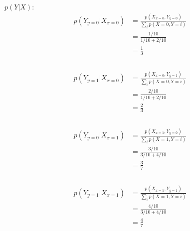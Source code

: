 \documentclass[12pt, fullpage,letterpaper]{article}
\begin{document}
\begin{enumerate}
\begin{enumerate}
\begin{enumerate}
             $p(Y|X)$:
            \[
            	\begin{split}
            		p(Y_{y=0}|X_{x=0}) &= \frac{p(X_{x=0},Y_{y=0})}{\sum_i p(X=0, Y=i)} 
            			\\
            			&= \frac{1/10}{1/10 + 2/10}
            			\\
            			&= \boxed{\frac{1}{3}}
            			\\
            	\end{split}
            \]
            \\
            \[
            	\begin{split}
            		p(Y_{y=1}|X_{x=0}) &= \frac{p(X_{x=0},Y_{y=1})}{\sum_i p(X=0, Y=i)} 
            			\\
            			&= \frac{2/10}{1/10 + 2/10}
            			\\
            			&= \boxed{\frac{2}{3}}
            			\\
            	\end{split}
            \]
            \\
            \[
            	\begin{split}
            		p(Y_{y=0}|X_{x=1}) &= \frac{p(X_{x=1},Y_{y=0})}{\sum_i p(X=1, Y=i)} 
            			\\
            			&= \frac{3/10}{3/10 + 4/10}
            			\\
            			&= \boxed{\frac{3}{7}}
            			\\
            	\end{split}
            \]
            \\
            \[
            	\begin{split}
            		p(Y_{y=1}|X_{x=1}) &= \frac{p(X_{x=1},Y_{y=1})}{\sum_i p(X=1, Y=i)} 
            			\\
            			&= \frac{4/10}{3/10 + 4/10}
            			\\
            			&= \boxed{\frac{4}{7}}
            			\\
            	\end{split}
            \]
            \\
            

\end{enumerate}
\end{enumerate}
\end{enumerate}
\end{document}
